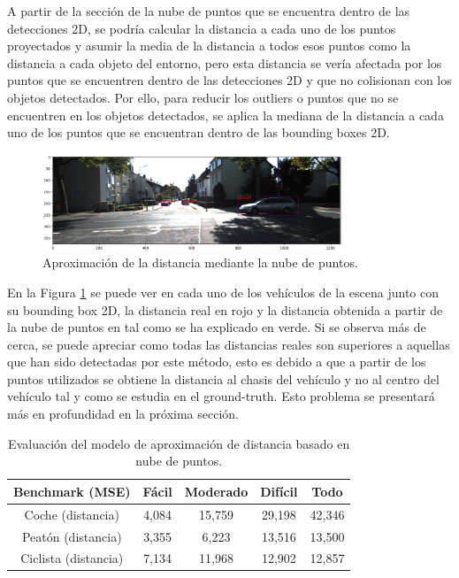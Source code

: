 A partir de la sección de la nube de puntos que se encuentra dentro de las detecciones 2D, se podría calcular la distancia a cada uno de los puntos proyectados y asumir la media de la distancia a todos esos puntos como la distancia a cada objeto del entorno, pero esta distancia se vería afectada por los puntos que se encuentren dentro de las detecciones 2D y que no colisionan con los objetos detectados. Por ello, para reducir los outliers o puntos que no se encuentren en los objetos detectados, se aplica la mediana de la distancia a cada uno de los puntos que se encuentran dentro de las bounding boxes 2D.

\begin{figure}[H]
    \centering
    \includegraphics[width=0.8\textwidth]{Book/figures/6_approx_distancia/pcl_projection_distance_kitti2.png}
    \caption{Aproximación de la distancia mediante la nube de puntos.}
    \label{fig:Aproximación de la distancia mediante la nube de puntos.}
\end{figure}

En la Figura \ref{fig:Aproximación de la distancia mediante la nube de puntos.} se puede ver en cada uno de los vehículos de la escena junto con su bounding box 2D, la distancia real en rojo y la distancia obtenida a partir de la nube de puntos en tal como se ha explicado en verde. Si se observa más de cerca, se puede apreciar como todas las distancias reales son superiores a aquellas que han sido detectadas por este método, esto es debido a que a partir de los puntos utilizados se obtiene la distancia al chasis del vehículo y no al centro del vehículo tal y como se estudia en el ground-truth. Esto problema se presentará más en profundidad en la próxima sección.

\begin{table}[H]
\centering
\begin{tabular}{|c|c|c|c|c|}
\hline
\textbf{Benchmark (MSE)} & \textbf{Fácil} & \textbf{Moderado} & \textbf{Difícil} & \textbf{Todo}\\ \hline \hline
Coche (distancia)        & 4,084          & 15,759             & 29,198   &42,346         \\ \hline
Peatón (distancia)       & 3,355          & 6,223             & 13,516    &13,500         \\ \hline
Ciclista (distancia)     & 7,134          & 11,968             & 12,902   &12,857        \\ \hline
\end{tabular}
\caption{Evaluación del modelo de aproximación de distancia basado en nube de puntos.}
\label{fig:Evaluación sobre KITTI del primer modelo de aproximación de distancia basado en nube de puntos.}
\end{table}

